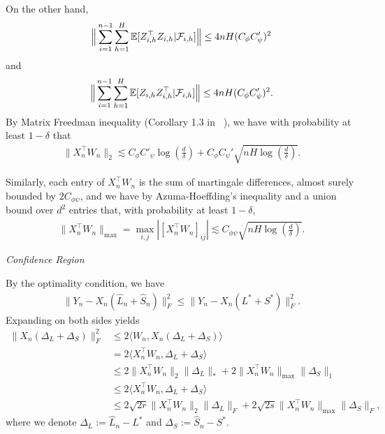 On the other hand,
\[\Big\|\sum_{i=1}^{n-1}\sum_{h=1}^H \mathbb{E}[Z_{i,h}^{\top} Z_{i,h}|{\cal F}_{i,h}]\Big\|\le 4nH(C_{\phi}C_{\psi}')^2\]
and 
\[\Big\|\sum_{i=1}^{n-1}\sum_{h=1}^H \mathbb{E}[Z_{i,h} Z_{i,h}^{\top}|{\cal F}_{i,h}]\Big\|\le 4nH(C_{\phi}C_{\psi}')^2.\]
By Matrix Freedman inequality (Corollary 1.3 in ~\cite{tropp2011freedman}), we have with probability at least $1-\delta$ that
\begin{align*}
\|X_n^\top W_n\|_2\lesssim C_{\phi}C'_{\psi}\log\left(\frac{d}{\delta}\right)+C_{\phi}C_{\psi}'\sqrt{nH\log\left(\frac{d}{\delta}\right)}.
\end{align*}

Similarly, each entry of $X_n^\top W_n$ is the sum of  martingale differences, almost surely bounded by $2C_{\phi\psi}$, and we have by Azuma-Hoeffding's inequality and a union bound over $d^2$ entries that, with probability at least $1-\delta$,
\begin{align*}
\|X_n^\top W_n\|_{\max}=\max_{i,j}|[X_n^\top W_n]_{ij}|\lesssim C_{\phi\psi}\sqrt{nH\log\left(\frac{d}{\delta}\right)}.
\end{align*}





\emph{Confidence Region}

By the optimality condition, we have
\begin{align*}
\|Y_n-X_n(\hat L_n+\hat S_n)\|_F^2\le \|Y_n-X_n( L^*+ S^*)\|_F^2.
\end{align*}
Expanding on both sides yields
\begin{align*}
\|X_n(\Delta_L+\Delta_S)\|_F^2&\le 2\langle W_n,X_n(\Delta_L+\Delta_S)\rangle\\
&=2\langle X_n^\top W_n,\Delta_L+\Delta_S\rangle\\&\le 2\|X_n^\top W_n\|_2\|\Delta_L\|_*+2\|X_n^\top W_n\|_{\max}\|\Delta_S\|_1\\&\le 2\langle X_n^\top W_n,\Delta_L+\Delta_S\rangle\\&\le 2\sqrt{2r}\|X_n^\top W_n\|_2\|\Delta_L\|_F+2\sqrt{2s}\|X_n^\top W_n\|_{\max}\|\Delta_S\|_F,
\end{align*}
where we denote $\Delta_L:=\hat  L_n- L^*$ and $\Delta_S:=\hat  S_n- S^*$.

